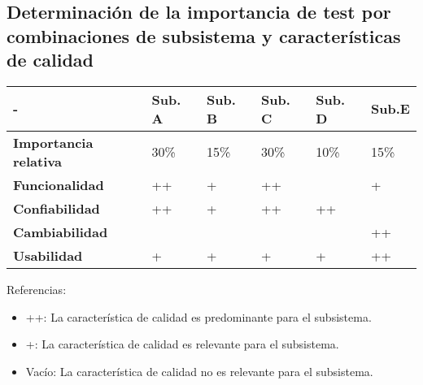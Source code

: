 \documentclass[
  11pt, %
  codirector, %
]{charter}
\begin{document}
\subsection{Determinación de  la importancia  de test por combinaciones de subsistema y características de calidad}
\label{sec:determinacion_importancia_test}

\begin{table}[h!]
	\centering
	\begin{tabular}{ | m{3cm} | m{2cm} | m{2cm} | m{2cm} | m{2cm} | m{2cm} | }
		\hline
		\rowcolor{gray!50} %
		\textbf{-} & \textbf{Sub. A} & \textbf{Sub. B} & \textbf{Sub. C} & \textbf{Sub. D} & \textbf{Sub.E} \\ \hline
    \textbf{Importancia relativa} & 30\% & 15\% & 30\% & 10\% & 15\%  \\ \hline
    \textbf{Funcionalidad} & ++ & + & ++ &  & + \\ \hline
    \textbf{Confiabilidad} & ++ & + & ++ & ++ & \\ \hline
    \textbf{Cambiabilidad} &  &  &  & & ++ \\ \hline
    \textbf{Usabilidad} & + & + & + & + & ++
    \\ \hline
	\end{tabular}

\end{table}

Referencias:
\begin{itemize}
\item ++: La característica de calidad es predominante para el subsistema.
\item +: La característica de calidad es relevante para el subsistema.
\item Vacío: La característica de calidad no es relevante para el subsistema.
\end{itemize}
\end{document}

